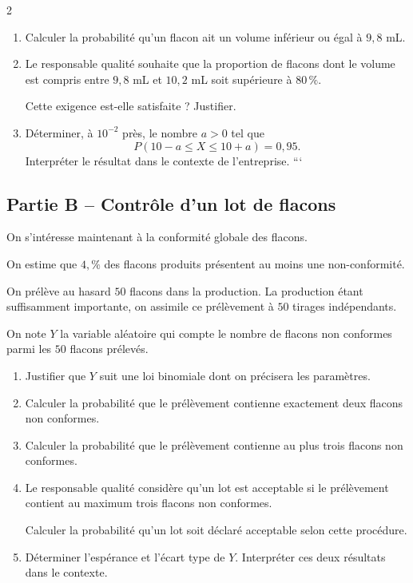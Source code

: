 \documentclass[10pt,a4paper]{article}
\begin{document}
\begin{multicols}{2}
\begin{exo}[][ccf]
\begin{enumerate}
```
\item Calculer la probabilité qu'un flacon ait un volume inférieur ou égal à \(9,8\) mL.

\item Le responsable qualité souhaite que la proportion de flacons dont le volume est compris entre \(9,8\) mL et \(10,2\) mL soit supérieure à \(80\,\%\).

Cette exigence est-elle satisfaite ? Justifier.

\item Déterminer, à \(10^{-2}\) près, le nombre \(a>0\) tel que
\[
P(10-a\leq X\leq10+a)=0,95.
\]
Interpréter le résultat dans le contexte de l'entreprise.
```

\end{enumerate}

\subsection*{Partie B -- Contrôle d'un lot de flacons}

On s'intéresse maintenant à la conformité globale des flacons.

On estime que \(4,\%\) des flacons produits présentent au moins une non-conformité.

On prélève au hasard \(50\) flacons dans la production. La production étant suffisamment importante, on assimile ce prélèvement à \(50\) tirages indépendants.

On note \(Y\) la variable aléatoire qui compte le nombre de flacons non conformes parmi les \(50\) flacons prélevés.

\begin{enumerate}
\item Justifier que \(Y\) suit une loi binomiale dont on précisera les paramètres.

\item Calculer la probabilité que le prélèvement contienne exactement deux flacons non conformes.

\item Calculer la probabilité que le prélèvement contienne au plus trois flacons non conformes.

\item Le responsable qualité considère qu'un lot est acceptable si le prélèvement contient au maximum trois flacons non conformes.

Calculer la probabilité qu'un lot soit déclaré acceptable selon cette procédure.

\item Déterminer l'espérance et l'écart type de \(Y\). Interpréter ces deux résultats dans le contexte.


\end{enumerate}

\end{exo}
\end{multicols}
\end{document}
